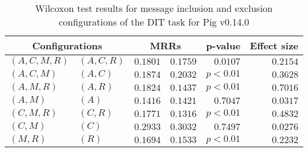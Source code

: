 
\begin{table}
\begin{spacing}{1.2}
\centering
\caption{Wilcoxon test results for message inclusion and exclusion configurations of the DIT task for Pig v0.14.0}
\label{table:versus-wilcox-pig-dit-message}
\begin{tabular}{ll|rr|rr}
\toprule
      \multicolumn{2}{c|}{Configurations} &          \multicolumn{2}{c|}{MRRs} &       p-value & Effect size \\
\midrule
 $(A,C,M,R)$ &  $(A,C,R)$ & $0.1801$ & $0.1759$ & $0.0107$ &    $0.2154$ \\
   $(A,C,M)$ &    $(A,C)$ & $0.1874$ & $0.2032$ & $p<0.01$ &    $0.3628$ \\
   $(A,M,R)$ &    $(A,R)$ & $0.1824$ & $0.1437$ & $p<0.01$ &    $0.7016$ \\
     $(A,M)$ &      $(A)$ & $0.1416$ & $0.1421$ & $0.7047$ &    $0.0317$ \\
   $(C,M,R)$ &    $(C,R)$ & $0.1771$ & $0.1316$ & $p<0.01$ &    $0.4832$ \\
     $(C,M)$ &      $(C)$ & $0.2933$ & $0.3032$ & $0.7497$ &    $0.0276$ \\
     $(M,R)$ &      $(R)$ & $0.1694$ & $0.1533$ & $p<0.01$ &    $0.2232$ \\
\bottomrule
\end{tabular}

\end{spacing}
\end{table}

